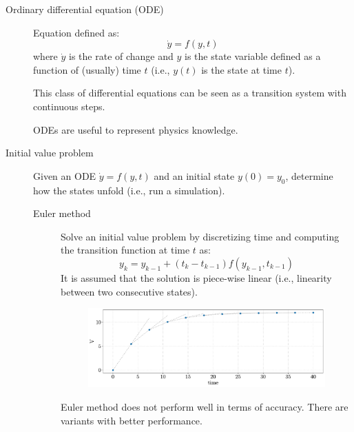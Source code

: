 \begin{description}
    \item[Ordinary differential equation (ODE)] 
        Equation defined as:
        \[ \dot{y} = f(y, t) \]
        where $\dot{y}$ is the rate of change and $y$ is the state variable defined as a function of (usually) time $t$ (i.e., $y(t)$ is the state at time $t$).

        \begin{remark}
            This class of differential equations can be seen as a transition system with continuous steps.
        \end{remark}

        \begin{remark}
            ODEs are useful to represent physics knowledge.
        \end{remark}

    \item[Initial value problem] 
        Given an ODE $\dot{y} = f(y, t)$ and an initial state $y(0) = y_0$, determine how the states unfold (i.e., run a simulation).

        \begin{description}
            \item[Euler method] 
                Solve an initial value problem by discretizing time and computing the transition function at time $t$ as:
                \[ y_k = y_{k-1} + (t_k - t_{k-1}) f(y_{k-1}, t_{k-1}) \]
                It is assumed that the solution is piece-wise linear (i.e., linearity between two consecutive states).

                \begin{figure}[H]
                    \centering
                    \includegraphics[width=0.7\linewidth]{./img/_rc_euler.pdf}
                \end{figure}

                \begin{remark}
                    Euler method does not perform well in terms of accuracy. There are variants with better performance.
                \end{remark}
        \end{description}


\end{description}
